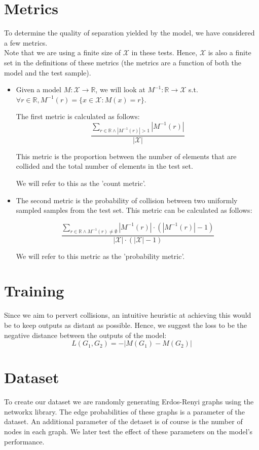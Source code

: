 \documentclass{article}
\begin{document}
\section*{Metrics}
To determine the quality of separation yielded by the model, we have considered a few metrics.\\
Note that we are using a finite size of $\mathcal{X}$ in these tests. Hence, $\mathcal{X}$
is also a finite set in the definitions of these metrics (the metrics are a function of both the model and the test sample).
\begin{itemize}
    \item Given a model $M:\mathcal{X}\rightarrow\mathbb{R}$, 
    we will look at $M^{-1}:\mathbb{R}\rightarrow\mathcal{X}$ s.t. 
    $\forall r\in\mathbb{R}, M^{-1}(r)=\{x\in\mathcal{X}:M(x)=r\}$.

    The first metric is calculated as follows:
    \[
        \frac{\sum_{r\in\mathbb{R}\wedge |M^{-1}(r)|>1}|M^{-1}(r)|}
        {|\mathcal{X}|}
    \]

    This metric is the proportion between the number of elements 
    that are collided and the total number of elements in the test set.
    
    We will refer to this as the 'count metric'.

    \item The second metric is the probability of collision
    between two uniformly sampled samples from the test set.
    This metric can be calculated as follows:

    \[
        \frac{\sum_{r\in\mathbb{R}\wedge M^{-1}(r)\neq\emptyset}|M^{-1}(r)|\cdot\left(|M^{-1}(r)|-1\right)}
        {|\mathcal{X}|\cdot\left(|\mathcal{X}|-1\right)}
    \]

    We will refer to this metric as the 'probability metric'.
\end{itemize}


\section*{Training}
Since we aim to pervert collisions, an intuitive heuristic at achieving this would be to keep
outputs as distant as possible.
Hence, we suggest the loss to be the negative distance between the outputs of the model:
\[
    L(G_1,G_2)=-|M(G_1)-M(G_2)|    
\]

\section*{Dataset}
To create our dataset we are randomly generating Erdos-Renyi graphs using the networkx library. The edge probabilities of
these graphs is a parameter of the dataset. An additional parameter of the detaset is of course is the number
of nodes in each graph. We later test the effect of these parameters on the model's performance.\\
\end{document}
